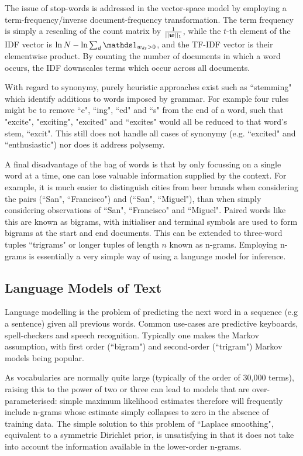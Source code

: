 The issue of stop-words is addressed in the vector-space model by employing a term-frequency/inverse document-frequency transformation. The term frequency is simply a rescaling of the count matrix by $\frac{1}{||\bm w||_1}$, while the $t$-th element of the IDF vector is $\ln N - \ln \sum_d \one_{w_{dt} > 0}$, and the TF-IDF vector is their elementwise product. By counting the number of documents in which a word occurs, the IDF downscales terms which occur across all documents. 

With regard to synonymy, purely heuristic approaches exist such as ``stemming" which identify additions to words imposed by grammar. For example four rules might be to remove ``e", ``ing", ``ed" and ``s" from the end of a word, such that "excite", "exciting", "excited" and ``excites" would all be reduced to that word's stem, ``excit". This still does not handle all cases of synonymy (e.g. ``excited" and ``enthusiastic") nor does it address polysemy.

A final disadvantage of the bag of words is that by only focussing on a single word at a time, one can lose valuable information supplied by the context. For example, it is much easier to distinguish cities from beer brands when considering the pairs (``San", ``Francisco") and (``San", ``Miguel"), than when simply considering observations of ``San", ``Francisco" and ``Miguel". Paired words like this are known as bigrams, with initialiser and terminal symbols are used to form bigrams at the start and end documents. This can be extended to three-word tuples ``trigrams" or longer tuples of length $n$ known as n-grams. Employing n-grams is essentially a very simple way of using a language model for inference.


\subsection{Language Models of Text}
\label{sec:langmodels}
Language modelling is the problem of predicting the next word in a sequence (e.g a sentence) given all previous words. Common use-cases are predictive keyboards, spell-checkers and speech recognition. Typically one makes the Markov assumption, with first order (``bigram") and second-order (``trigram") Markov models being popular. 

As vocabularies are normally quite large (typically of the order of 30,000 terms), raising this to the power of two or three can lead to models that are over-parameterised: simple maximum likelihood estimates therefore will frequently include n-grams whose estimate simply collapses to zero in the absence of training data. The simple solution to this problem  of ``Laplace smoothing", equivalent to a symmetric Dirichlet prior, is unsatisfying in that it does not take into account the information available in the lower-order n-grams.

